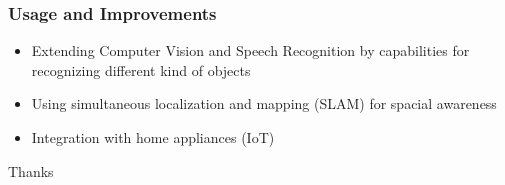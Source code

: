 \documentclass{beamer}
\begin{document}
\begin{frame}
  \frametitle{Usage and Improvements}
  \begin{itemize}
    \item Extending Computer Vision and Speech Recognition by capabilities for
      recognizing different kind of objects
    \item Using simultaneous localization and mapping (SLAM) for spacial awareness
    \item Integration with home appliances (IoT)
  \end{itemize}
\end{frame}

\begin{frame}[c]
  \begin{center}
    \Huge Thanks 
  \end{center}
\end{frame}
\end{document}
